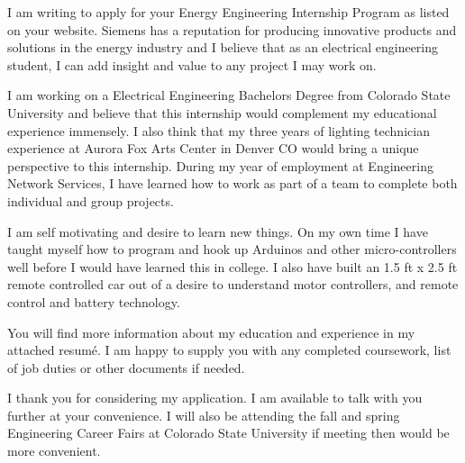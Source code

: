 \documentclass[11pt,letterpaper,sans]{moderncv}        %
\begin{document}
I am writing to apply for your Energy Engineering Internship Program as listed on your website. Siemens has a reputation for producing innovative products and solutions in the energy industry and I believe that as an electrical engineering student, I can add insight and value to any project I may work on.

I am working on a Electrical Engineering Bachelors Degree from Colorado State University and believe that this internship would complement my educational experience immensely. I also think that my three years of lighting technician experience at Aurora Fox Arts Center in Denver CO would bring a unique perspective to this internship. During my year of employment at Engineering Network Services, I have learned how to work as part of a team to complete both individual and group projects. 

I am self motivating and desire to learn new things. On my own time I have taught myself how to program and hook up Arduinos and other micro-controllers well before I would have learned this in college. I also have built an 1.5 ft x 2.5 ft remote controlled car out of a desire to understand motor controllers, and remote control and battery technology.

You will find more information about my education and experience in my attached resum\'e. I am happy to supply you with any completed coursework, list of job duties or other documents if needed.

I thank you for considering my application. I am available to talk with you further at your convenience. I will also be attending the fall and spring Engineering Career Fairs at Colorado State University if meeting then would be more convenient.



\makeletterclosing

\end{document}
